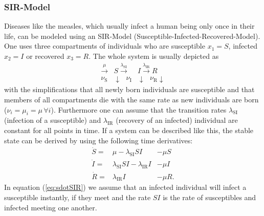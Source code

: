 \subsubsection{SIR-Model}
Diseases like the measles, which usually infect a human being only once in their life, can be modeled using an SIR-Model (Susceptible-Infected-Recovered-Model). One uses three compartments of individuals who are susceptible $x_1 = S$, infected $x_2=I$ or recovered $x_3=R$. The whole system is usually depicted as 
\begin{eqnarray}
\xrightarrow{\mu} &S \xrightarrow{\lambda_\text{SI}} &I  \xrightarrow{\lambda_\text{IR}} R  \\
{\nu_\text{S}} & \downarrow \text{         }\nu_\text{I} &\downarrow \text{  } {\nu_\text{R}} \downarrow \nonumber
\end{eqnarray}
with the simplifications that all newly born individuals are susceptible and that members of all compartments die with the same rate as new individuals are born ($\nu_i = \mu_i = \mu\, \forall i$). Furthermore one can assume that the transition rates $\lambda_\text{SI}$ (infection of a susceptible) and $\lambda_\text{IR}$ (recovery of an infected) individual are constant for all points in time.
If a system can be described like this, the stable state can be derived by using the following time derivatives:
\begin{eqnarray}
\dot{S} =& \mu -\lambda_\text{SI} SI &-  \mu S  \label{eq:sdotSIR}\\ 
\dot{I} =& \lambda_\text{SI} SI - \lambda_\text{IR} I  &-\mu I \\
\dot{R} =& \lambda_\text{IR} I & -\mu R. \label{eq:rdotsir}
\end{eqnarray}
In equation (\ref{eq:sdotSIR}) we assume that an infected individual will infect a susceptible instantly, if they meet and the rate $SI$ is the rate of susceptibles and infected meeting one another. 
